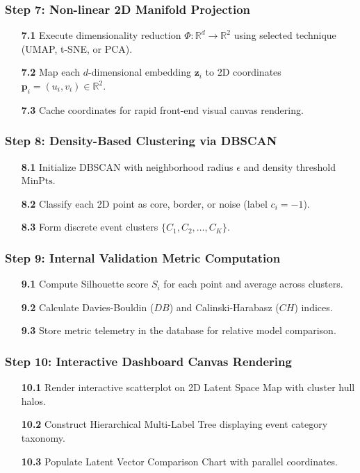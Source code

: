 \documentclass[12pt,a4paper]{report}
\begin{document}
\subsubsection*{Step 7: Non-linear 2D Manifold Projection}
\begin{enumerate}
  \item[\textbf{7.1}] Execute dimensionality reduction $\Phi: \mathbb{R}^d \to \mathbb{R}^2$ using selected technique (UMAP, t-SNE, or PCA).
  \item[\textbf{7.2}] Map each $d$-dimensional embedding $\mathbf{z}_i$ to 2D coordinates $\mathbf{p}_i = (u_i, v_i) \in \mathbb{R}^2$.
  \item[\textbf{7.3}] Cache coordinates for rapid front-end visual canvas rendering.
\end{enumerate}

\subsubsection*{Step 8: Density-Based Clustering via DBSCAN}
\begin{enumerate}
  \item[\textbf{8.1}] Initialize DBSCAN with neighborhood radius $\epsilon$ and density threshold $\text{MinPts}$.
  \item[\textbf{8.2}] Classify each 2D point as core, border, or noise (label $c_i = -1$).
  \item[\textbf{8.3}] Form discrete event clusters $\{C_1, C_2, \dots, C_K\}$.
\end{enumerate}

\subsubsection*{Step 9: Internal Validation Metric Computation}
\begin{enumerate}
  \item[\textbf{9.1}] Compute Silhouette score $S_i$ for each point and average across clusters.
  \item[\textbf{9.2}] Calculate Davies-Bouldin ($DB$) and Calinski-Harabasz ($CH$) indices.
  \item[\textbf{9.3}] Store metric telemetry in the database for relative model comparison.
\end{enumerate}

\subsubsection*{Step 10: Interactive Dashboard Canvas Rendering}
\begin{enumerate}
  \item[\textbf{10.1}] Render interactive scatterplot on 2D Latent Space Map with cluster hull halos.
  \item[\textbf{10.2}] Construct Hierarchical Multi-Label Tree displaying event category taxonomy.
  \item[\textbf{10.3}] Populate Latent Vector Comparison Chart with parallel coordinates.
\end{enumerate}
\end{document}
